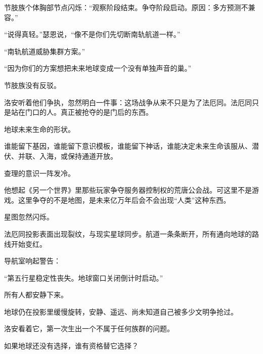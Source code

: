 节肢族个体胸部节点闪烁：“观察阶段结束。争夺阶段启动。原因：多方预测不兼容。”

“说得真轻。”瑟恩说，“像不是你们先切断南轨航道一样。”

“南轨航道威胁集群方案。”

“因为你们的方案想把未来地球变成一个没有单独声音的巢。”

节肢族没有反驳。

洛安听着他们争执，忽然明白一件事：这场战争从来不只是为了法厄同。法厄同只是站在门口的人。真正被抢夺的是门后的东西。

地球未来生命的形状。

谁能留下基因，谁能留下意识模板，谁能留下神话，谁能决定未来生命该服从、潜伏、并联、入海，或保持通道开放。

查理的意识一阵发冷。

他想起《另一个世界》里那些玩家争夺服务器控制权的荒唐公会战。可这里不是游戏。这里争夺的不是地图，是未来亿万年后会不会出现“人类”这种东西。

星图忽然闪烁。

法厄同投影表面出现裂纹，与现实星球同步。航道一条条断开，所有通向地球的路线开始变红。

导航室响起警告：

“第五行星稳定性丧失。地球窗口关闭倒计时启动。”

所有人都安静下来。

地球仍在投影里缓慢旋转，安静、遥远、尚未知道自己被多少文明争抢过。

洛安看着它，第一次生出一个不属于任何族群的问题。

如果地球还没有选择，谁有资格替它选择？
